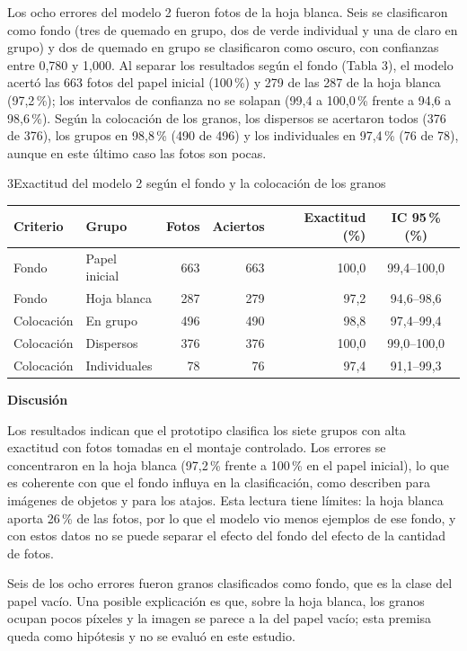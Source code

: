Los ocho errores del modelo 2 fueron fotos de la hoja blanca. Seis se clasificaron como fondo (tres de quemado en grupo, dos de verde individual y una de claro en grupo) y dos de quemado en grupo se clasificaron como oscuro, con confianzas entre 0,780 y 1,000. Al separar los resultados según el fondo (Tabla 3), el modelo acertó las 663 fotos del papel inicial (100\,\%) y 279 de las 287 de la hoja blanca (97,2\,\%); los intervalos de confianza no se solapan (99,4 a 100,0\,\% frente a 94,6 a 98,6\,\%). Según la colocación de los granos, los dispersos se acertaron todos (376 de 376), los grupos en 98,8\,\% (490 de 496) y los individuales en 97,4\,\% (76 de 78), aunque en este último caso las fotos son pocas.

\begin{apatable}{3}{Exactitud del modelo 2 según el fondo y la colocación de los granos}
\begin{tabular}{@{}llrrrc@{}}
\toprule
Criterio & Grupo & Fotos & Aciertos & Exactitud (\%) & IC 95\,\% (\%)\\
\midrule
Fondo & Papel inicial & 663 & 663 & 100,0 & 99,4--100,0\\
Fondo & Hoja blanca & 287 & 279 & 97,2 & 94,6--98,6\\
\midrule
Colocación & En grupo & 496 & 490 & 98,8 & 97,4--99,4\\
Colocación & Dispersos & 376 & 376 & 100,0 & 99,0--100,0\\
Colocación & Individuales & 78 & 76 & 97,4 & 91,1--99,3\\
\bottomrule
\end{tabular}
\end{apatable}

\textbf{Discusión}

Los resultados indican que el prototipo clasifica los siete grupos con alta exactitud con fotos tomadas en el montaje controlado. Los errores se concentraron en la hoja blanca (97,2\,\% frente a 100\,\% en el papel inicial), lo que es coherente con que el fondo influya en la clasificación, como describen \citet{xiao2020} para imágenes de objetos y \citet{geirhos2020} para los atajos. Esta lectura tiene límites: la hoja blanca aporta 26\,\% de las fotos, por lo que el modelo vio menos ejemplos de ese fondo, y con estos datos no se puede separar el efecto del fondo del efecto de la cantidad de fotos.

Seis de los ocho errores fueron granos clasificados como fondo, que es la clase del papel vacío. Una posible explicación es que, sobre la hoja blanca, los granos ocupan pocos píxeles y la imagen se parece a la del papel vacío; esta premisa queda como hipótesis y no se evaluó en este estudio.

